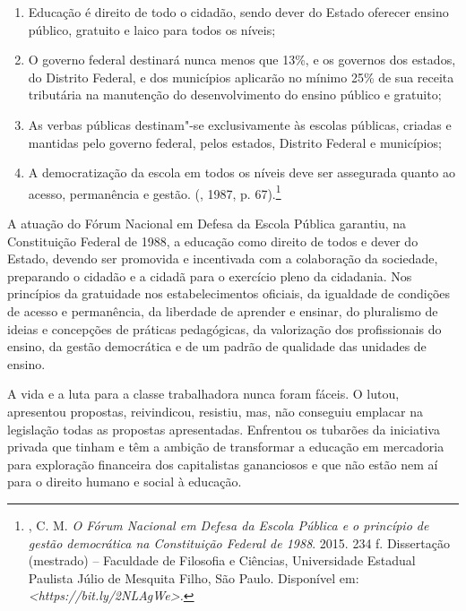 \begin{enumerate}
\item{}Educação é direito de todo o cidadão, sendo dever do Estado
oferecer ensino público, gratuito e laico para todos os níveis;

\item{}O governo federal destinará nunca menos que 13\%, e os governos
dos estados, do Distrito Federal, e dos municípios aplicarão no mínimo
25\% de sua receita tributária na manutenção do desenvolvimento do
ensino público e gratuito;

\item{}As verbas públicas destinam"-se exclusivamente às escolas
públicas, criadas e mantidas pelo governo federal, pelos estados,
Distrito Federal e municípios;

\item{}A democratização da escola em todos os níveis deve ser
assegurada quanto ao acesso, permanência e gestão. (, 1987, p.
67).\footnote{, C. M. \emph{O Fórum Nacional em
  Defesa da Escola Pública e o princípio de gestão democrática na
  Constituição Federal de 1988}. 2015. 234 f. Dissertação (mestrado) --
  Faculdade de Filosofia e Ciências, Universidade Estadual Paulista
  Júlio de Mesquita Filho, São Paulo. Disponível em:
  \emph{\textless{}https://bit.ly/2NLAgWe\textgreater{}.}}
\end{enumerate}

A atuação do Fórum Nacional em Defesa da Escola Pública garantiu, na
Constituição Federal de 1988, a educação como direito de todos e dever
do Estado, devendo ser promovida e incentivada com a colaboração da
sociedade, preparando o cidadão e a cidadã para o exercício pleno da
cidadania. Nos princípios da gratuidade nos estabelecimentos oficiais,
da igualdade de condições de acesso e permanência, da liberdade de
aprender e ensinar, do pluralismo de ideias e concepções de práticas
pedagógicas, da valorização dos profissionais do ensino, da gestão
democrática e de um padrão de qualidade das unidades de ensino.

A vida e a luta para a classe trabalhadora nunca foram fáceis. O 
lutou, apresentou propostas, reivindicou, resistiu, mas, não conseguiu
emplacar na legislação todas as propostas apresentadas. Enfrentou os
tubarões da iniciativa privada que tinham e têm a ambição de transformar
a educação em mercadoria para exploração financeira dos capitalistas
gananciosos e que não estão nem aí para o direito humano e social à
educação.

